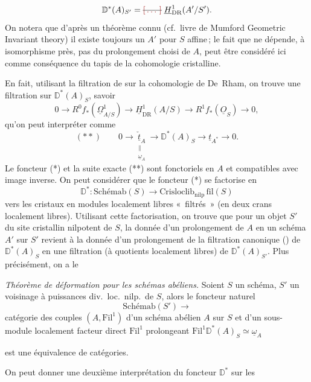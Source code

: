 \documentclass[11pt,a4paper]{article}
\begin{document}
\[
  \mathbb{D}^*(A)_{S'} = \text{\struck{\ill{}}}\; \underline{H}^1_{\mathrm{DR}}(A'/S') .
\]
On notera que d'après un théorème connu (cf.\ livre de Mumford Geometric Invariant theory) il existe toujours un $A'$ pour $S$ affine\,; le fait que \struck{\ill{}}  ne dépende, à isomorphisme près, pas du prolongement choisi de $A$, peut être considéré ici comme conséquence du tapis de la cohomologie cristalline.

En fait, utilisant la filtration de   sur la cohomologie de De~Rham, on trouve une filtration sur $\mathbb{D}^*(A)_S$, savoir
\[
  0 \longrightarrow R^0 f_*(\underline{\Omega}^1_{A/S}) \longrightarrow \underline{H}^1_{\mathrm{DR}}(A/S) \longrightarrow R^1 f_*(\underline{O}_S) \longrightarrow 0 ,
\]
qu'on peut interpréter comme
\[
  (**) \qquad 0 \longrightarrow \underset{\substack{\parallel \\ \underline{\omega}_A}}{\underline{\check{t}}_A} \longrightarrow \mathbb{D}^*(A)_S \longrightarrow \underline{t}_{A^*} \longrightarrow 0 .
\]
Le foncteur (*) et la suite exacte (**) sont fonctoriels en $A$ et compatibles avec image inverse. On peut  considérer que le foncteur (*) se factorise en
\[
  \mathbb{D}^* : \mathrm{Schémab}(S) \longrightarrow \mathrm{Crisloclib}_{\mathrm{nilp}}\,\mathrm{fil}(S)
\]
vers les cristaux en modules localement libres «~filtrés~» (en deux crans localement libres). Utilisant cette factorisation, on trouve que pour un objet $S'$ du site cristallin nilpotent de $S$, la donnée d'un prolongement de $A$ en un schéma  $A'$ sur $S'$ revient à la donnée d'un prolongement de la filtration canonique (\struck{(**)}) de $\mathbb{D}^*(A)_S$ en une filtration (à quotients localement libres) de $\mathbb{D}^*(A)_{S'}$. Plus précisément, on a le

\emph{Théorème de déformation pour les schémas abéliens.} Soient $S$ un schéma, $S'$ un voisinage à puissances div.\ loc.\ nilp.\ de $S$, alors le foncteur naturel
\[
  \mathrm{Schémab}(S') \longrightarrow
\]
catégorie des couples $(A, \mathrm{Fil}^1)$ d'un schéma abélien $A$ sur $S$ et d'un sous-module localement facteur direct $\mathrm{Fil}^1$  prolongeant $\mathrm{Fil}^1\mathbb{D}^*(A)_S \simeq \underline{\omega}_A$

est une équivalence de catégories.

 On peut donner une deuxième interprétation du foncteur $\mathbb{D}^*$ sur les
\end{document}
